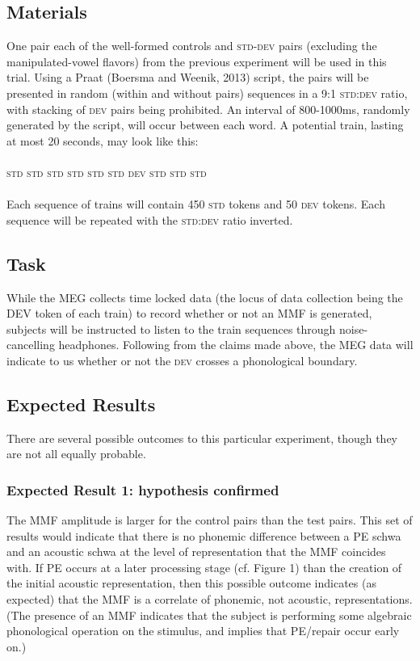 \documentclass[jou,apacite]{apa6}
\begin{document}
    \subsection{Materials}
    One pair each of the well-formed controls and \textsc{std-dev} pairs (excluding the manipulated-vowel flavors) from the previous experiment will be used in this trial. Using a Praat (Boersma and Weenik, 2013) script, the pairs will be presented in random (within and without pairs) sequences in a 9:1 \textsc{std:dev} ratio, with stacking of \textsc{dev} pairs being prohibited. An interval of 800-1000ms, randomly generated by the script, will occur between each word. A potential train, lasting at most 20 seconds, may look like this:
    \\
    \\
    \textsc{std std std std std std dev std std std}
    \\
    \\
    Each sequence of trains will contain 450 \textsc{std} tokens and 50 \textsc{dev} tokens. Each sequence will be repeated with the \textsc{std:dev} ratio inverted.
    
    \subsection{Task}    
    While the MEG collects time locked data (the locus of data collection being the DEV token of each train) to record whether or not an MMF is generated, subjects will be instructed to listen to the train sequences through noise-cancelling headphones. Following from the claims made above, the MEG data will indicate to us whether or not the \textsc{dev} crosses a phonological boundary.
    
    \subsection{Expected Results}
   There are several possible outcomes to this particular experiment, though they are not all equally probable.
   
        \subsubsection{Expected Result 1: hypothesis confirmed}
        The MMF amplitude is larger for the control pairs than the test pairs. This set of results would indicate that there is no phonemic difference between a PE schwa and an acoustic schwa at the level of representation that the MMF coincides with. If PE occurs at a later processing stage (cf. Figure 1) than the creation of the initial acoustic representation, then this possible outcome indicates (as expected) that the MMF is a correlate of phonemic, not acoustic, representations. (The presence of an MMF indicates that the subject is performing some algebraic phonological operation on the stimulus, and implies that PE/repair occur early on.)
        
\end{document}
